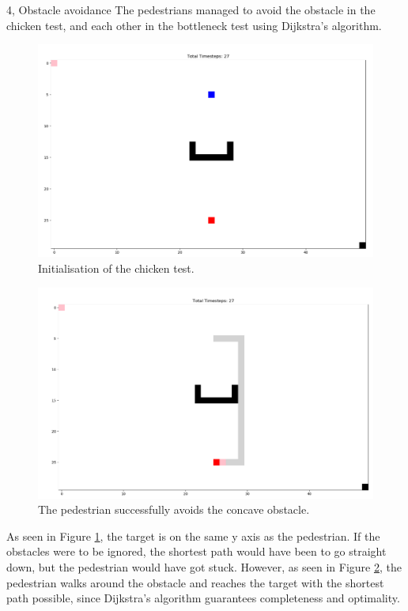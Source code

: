 \documentclass[10pt,a4paper]{article}
\begin{document}
\begin{task}{4, Obstacle avoidance}
The pedestrians managed to avoid the obstacle in the chicken test, and each other in the bottleneck test using Dijkstra’s algorithm.
\begin{figure}[h!]
    \centering
    \includegraphics[width=\textwidth]{pictures/start_task4_obst.PNG}
    \caption{Initialisation of the chicken test.}
    \label{fig:obst_start}
\end{figure}
\begin{figure}[h!]
    \centering
    \includegraphics[width=\textwidth]{pictures/end_task4_obst.PNG}
    \caption{The pedestrian successfully avoids the concave obstacle.}
    \label{fig:obst_end}
\end{figure}
As seen in Figure \ref{fig:obst_start}, the target is on the same y axis as the pedestrian. If the obstacles were to be ignored, the shortest path would have been to go straight down, but the pedestrian would have got stuck. However, as seen in Figure \ref{fig:obst_end}, the pedestrian walks around the obstacle and reaches the target with the shortest path possible, since Dijkstra’s algorithm guarantees completeness and optimality. \\

\end{task}
\end{document}
